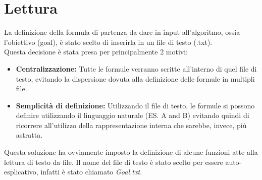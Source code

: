 \documentclass[\main/tesi.tex]{subfiles}
\begin{document}
\newpage

\section{Lettura}
La definizione della formula di partenza da dare in input all'algoritmo, ossia l'obiettivo (goal), è stato scelto di inserirla in un file di testo (.txt). \\
Questa decisione è stata presa per principalmente 2 motivi:
\begin{itemize}
  \item \textbf{Centralizzazione:} Tutte le formule verranno scritte all'interno di quel file di testo, evitando la dispersione dovuta alla definizione delle formule in multipli file.
  \item \textbf{Semplicità di definizione:} Utilizzando il file di testo, le formule si possono definire utilizzando il linguaggio naturale (ES. A and B) evitando quindi di ricorrere all'utilizzo della rappresentazione interna che sarebbe, invece, più astratta.
\end{itemize}
Questa soluzione ha ovviamente imposto la definizione di alcune funzioni atte alla lettura di testo da file.
Il nome del file di testo è stato scelto per essere auto-esplicativo, infatti è stato chiamato \textit{Goal.txt}. \\
\end{document}
